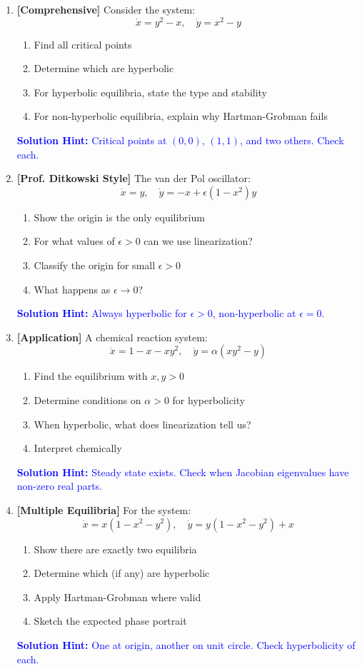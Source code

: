 \documentclass[12pt]{article}
\newcommand{\solution}[1]{\textcolor{blue}{\textbf{Solution Hint:} #1}}
\begin{document}
\begin{enumerate}[resume]
\item \textbf{[Comprehensive]} Consider the system:
$$\dot{x} = y^2 - x, \quad \dot{y} = x^2 - y$$
\begin{enumerate}[label=(\alph*)]
    \item Find all critical points
    \item Determine which are hyperbolic
    \item For hyperbolic equilibria, state the type and stability
    \item For non-hyperbolic equilibria, explain why Hartman-Grobman fails
\end{enumerate}
\solution{Critical points at $(0,0)$, $(1,1)$, and two others. Check each.}

\item \textbf{[Prof. Ditkowski Style]} The van der Pol oscillator:
$$\dot{x} = y, \quad \dot{y} = -x + \epsilon(1 - x^2)y$$
\begin{enumerate}[label=(\alph*)]
    \item Show the origin is the only equilibrium
    \item For what values of $\epsilon > 0$ can we use linearization?
    \item Classify the origin for small $\epsilon > 0$
    \item What happens as $\epsilon \to 0$?
\end{enumerate}
\solution{Always hyperbolic for $\epsilon > 0$, non-hyperbolic at $\epsilon = 0$.}

\item \textbf{[Application]} A chemical reaction system:
$$\dot{x} = 1 - x - xy^2, \quad \dot{y} = \alpha(xy^2 - y)$$
\begin{enumerate}[label=(\alph*)]
    \item Find the equilibrium with $x, y > 0$
    \item Determine conditions on $\alpha > 0$ for hyperbolicity
    \item When hyperbolic, what does linearization tell us?
    \item Interpret chemically
\end{enumerate}
\solution{Steady state exists. Check when Jacobian eigenvalues have non-zero real parts.}

\item \textbf{[Multiple Equilibria]} For the system:
$$\dot{x} = x(1 - x^2 - y^2), \quad \dot{y} = y(1 - x^2 - y^2) + x$$
\begin{enumerate}[label=(\alph*)]
    \item Show there are exactly two equilibria
    \item Determine which (if any) are hyperbolic
    \item Apply Hartman-Grobman where valid
    \item Sketch the expected phase portrait
\end{enumerate}
\solution{One at origin, another on unit circle. Check hyperbolicity of each.}


\end{enumerate}
\end{document}
